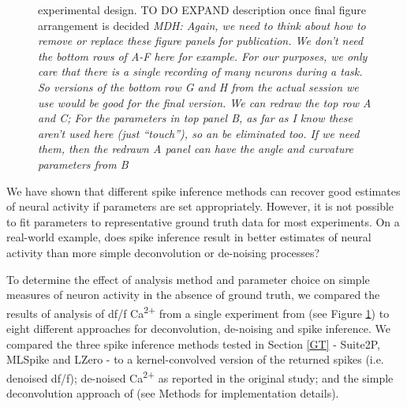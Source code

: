 \documentclass[a4paper,10pt,twocolumn]{article}
\begin{document}
\begin{figure}[h!]
\caption{\label{fig:peron_setup} \citep{Peron2015-qz} experimental design. TO DO EXPAND description once final figure arrangement is decided 
\emph{MDH: Again, we need to think about how to remove or replace these figure panels for publication.
We don’t need  the bottom rows of A-F here for example. For our purposes, we only care that there is a single recording of many neurons during a task.
So versions of the bottom row G and H from the actual session we use would be good for the final version.
We can redraw the top row A and C; 
For the parameters in top panel B, as far as I know these aren’t used here (just “touch”), so an be eliminated too. If we need them, then the redrawn A panel can have the angle and curvature parameters from B}}
\end{figure}

We have shown that different spike inference methods can recover good estimates of neural activity if parameters are set appropriately. However, it is not possible to fit parameters to representative ground truth data for most experiments. On a real-world example, does spike inference result in better estimates of neural activity than more simple deconvolution or de-noising processes? 

To determine the effect of analysis method and parameter choice on simple measures of neuron activity in the absence of ground truth, we compared the results of analysis of df/f Ca\textsuperscript{2+}  from a single experiment from \citealt{Peron2015-qz} (see Figure \ref{fig:peron_setup}) to eight different approaches for deconvolution, de-noising and spike inference. We compared the three spike inference methods tested in Section \ref{GT} - Suite2P, MLSpike and LZero - to a kernel-convolved version of the returned spikes (i.e. denoised df/f); de-noised Ca\textsuperscript{2+} as reported in the original \citet{Peron2015-qz} study; and the simple deconvolution approach of \citet{Yaksi2006-ic} (see Methods for implementation details).

\end{document}
